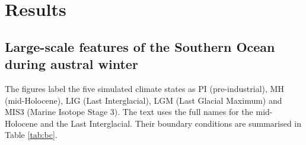 \documentclass[pdflatex,sn-nature]{sn-jnl}
\begin{document}


\section{Results}

\subsection{Large-scale features of the Southern Ocean during austral winter}

The figures label the five simulated climate states as PI (pre-industrial), MH (mid-Holocene), LIG (Last Interglacial), LGM (Last Glacial Maximum) and MIS3 (Marine Isotope Stage 3). The text uses the full names for the mid-Holocene and the Last Interglacial. Their boundary conditions are summarised in Table \ref{tab:bc}.
\end{document}
